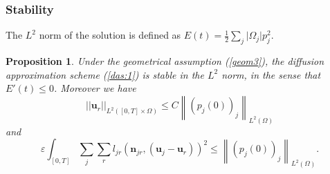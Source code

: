 \documentclass[a4paper,french,english,10pt]{article}
\newcommand\njr{\mathbf{n}_{jr}}
\newcommand\uu{\mathbf{u}}
\newcommand\eps{\varepsilon}
\newcommand\uj{\uu_j}
\newcommand\ur{\uu_r}
\newtheorem{pro}[theorem]{Proposition}
\begin{document}
\subsubsection*{Stability}
The $L^2$ norm of the solution is defined as
$
E(t)=
\displaystyle \frac12  \sum_j \vert \Omega_j\vert p_j^2$.

\begin{pro}\label{das_stab} Under the geometrical assumption (\ref{geom3}), the
diffusion approximation scheme (\ref{das:1})  is stable in the $L^2$
norm, in the sense that $E'(t)\leq 0$. Moreover we have
\begin{equation}\label{das:gggg}
\vert\vert \uu_r \vert\vert_{L^2([0,T]\times \Omega)}\leq
C  \left\|  \left( p_j(0)\right)_j \right\|_{L^2(\Omega)}
\end{equation}
and
\begin{equation}\label{das:gs}
\eps \int_{[0,T]}\sum_j \sum_r
l_{jr}(\njr,(\uj-\ur))^{2} \leq  
 \left\|  \left( p_j(0)\right)_j \right\|_{L^2(\Omega)}.
\end{equation}
\end{pro}
\end{document}
